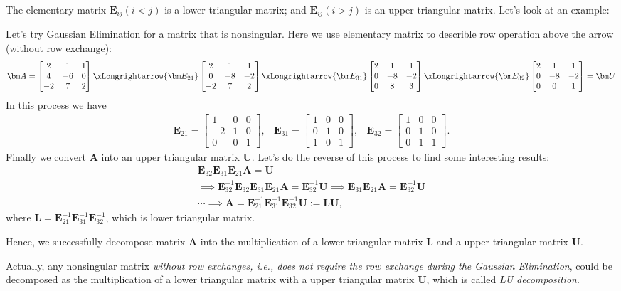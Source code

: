 The elementary matrix $\bm E_{ij} (i<j)$ is a lower triangular matrix; and $\bm E_{ij} (i>j)$ is an upper triangular matrix. Let’s look at an example:
\begin{example}
Let’s try Gaussian Elimination for a matrix that is nonsingular. Here we use elementary matrix to describle row operation above the arrow (without row exchange):
\[
\bm A=\begin{bmatrix}
2&1&1\\4&-6&0\\-2&7&2
\end{bmatrix}\xLongrightarrow{\bm E_{21}}
\begin{bmatrix}
2&1&1\\0&-8&-2\\-2&7&2
\end{bmatrix}\xLongrightarrow{\bm E_{31}}
\begin{bmatrix}
2&1&1\\0&-8&-2\\0&8&3
\end{bmatrix}\xLongrightarrow{\bm E_{32}}
\begin{bmatrix}
2&1&1\\0&-8&-2\\0&0&1
\end{bmatrix}=\bm U
\]
In this process we have 
\[
\begin{array}{lll}
\bm E_{21}=\begin{bmatrix}
1&0&0\\-2&1&0\\0&0&1
\end{bmatrix},
&
\bm E_{31}=\begin{bmatrix}
1&0&0\\0&1&0\\1&0&1
\end{bmatrix},
&
\bm E_{32}=\begin{bmatrix}
1&0&0\\0&1&0\\0&1&1
\end{bmatrix}.
\end{array}
\]
Finally we convert $\bm A$ into an upper triangular matrix $\bm U$. Let’s do the reverse of this process to find some interesting results:
\begin{gather*}
\bm E_{32}\bm E_{31}\bm E_{21}\bm A=\bm U\\
\implies
\bm E_{32}^{-1}\bm E_{32}\bm E_{31}\bm E_{21}\bm A=\bm E_{32}^{-1}\bm U
\implies
\bm E_{31}\bm E_{21}\bm A=\bm E_{32}^{-1}\bm U\\
\cdots\implies
\bm A=\bm E_{21}^{-1}\bm E_{31}^{-1}\bm E_{32}^{-1}\bm U:=\bm{LU},
\end{gather*}
where $\bm L=\bm E_{21}^{-1}\bm E_{31}^{-1}\bm E_{32}^{-1}$, which is lower triangular matrix.

Hence, we successfully decompose matrix $\bm A$ into the multiplication of a lower triangular matrix $\bm L$
and a upper triangular matrix $\bm U$.
\end{example}
Actually, any nonsingular matrix \textit{without row exchanges, i.e., does not require the row exchange during the Gaussian Elimination}, could be decomposed as the multiplication of a lower triangular matrix with a upper triangular matrix $\bm U$, which is called \emph{LU decomposition}.
